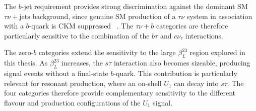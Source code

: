 The $b$-jet requirement provides strong discrimination against the dominant SM $\tau\nu+\mathrm{jets}$ background, since genuine SM production of a $\tau\nu$ system in association with a $b$-quark is CKM suppressed ~\cite{Endo2022NonResonant}. The $\tau\nu+b$ categories are therefore particularly sensitive to the combination of the $b\tau$ and $c\nu_{\tau}$ interactions.

The zero-$b$ categories extend the sensitivity to the large $\beta_{L}^{23}$ region explored in this thesis. As $\beta_{L}^{23}$ increases, the $s\tau$ interaction also becomes sizeable, producing signal events without a final-state $b$-quark. This contribution is particularly relevant for resonant production, where an on-shell $U_{1}$ can decay into $s\tau$. The four categories therefore provide complementary sensitivity to the different flavour and production configurations of the $U_{1}$ signal.
